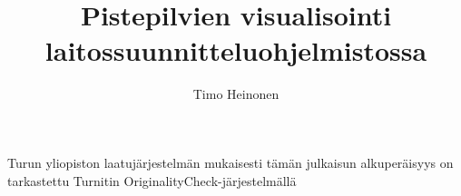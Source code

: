 \newcommand{\subtitle}[1]{\vspace{0.5cm}\noindent\large\textbf{#1}\normalsize\\\noindent}

\newcommand{\code}[1]{\noindent\footnotesize\texttt{#1}\normalsize}
\newcommand{\tab}[0]{\hspace*{1cm}}


\title{Pistepilvien visualisointi laitossuunnitteluohjelmistossa}
\author{Timo Heinonen}
\maketitle
\newpage
\thispagestyle{empty}
\vspace*{10cm}

\vfill

\hspace*{-2cm}\parbox{\textwidth}{Turun yliopiston laatujärjestelmän mukaisesti
  tämän julkaisun alkuperäisyys on tarkastettu Turnitin
  OriginalityCheck-järjestelmällä} 


